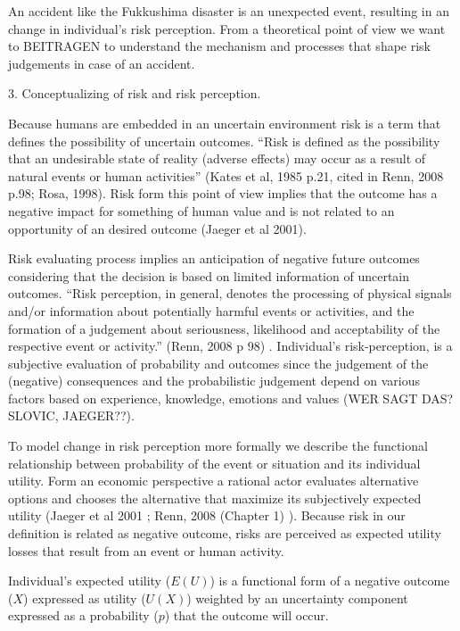 An accident like the Fukkushima disaster is an unexpected event, resulting in an change in individual's risk perception. From a theoretical point of view we want to BEITRAGEN to understand the mechanism and processes that shape risk judgements in case of an accident. 



                                                       

 
3. Conceptualizing of risk and risk perception. 

Because  humans are embedded in an uncertain environment risk is a term that defines the possibility of  uncertain outcomes.  ``Risk is defined as the possibility that an undesirable state of reality (adverse effects) may occur as a result of natural events or human activities'' (Kates et al, 1985 p.21, cited in Renn, 2008 p.98; Rosa, 1998). Risk form this point of view implies that the outcome has a negative impact for something of human value and is not related to an opportunity of an desired outcome (Jaeger et al 2001).

Risk evaluating process implies an anticipation of negative future outcomes considering that the decision is based on limited information of uncertain outcomes. ``Risk perception, in general, denotes the processing of physical signals and/or information about potentially harmful events or activities, and the formation of a judgement about seriousness, likelihood and acceptability of the respective event or activity.''  (Renn, 2008 p 98) \citep[98]{Renn:2008wq}. Individual's risk-perception, is a subjective evaluation of probability and outcomes since the judgement of the (negative) consequences and the probabilistic judgement depend on various factors based on experience, knowledge, emotions and values (WER SAGT DAS? SLOVIC, JAEGER??).        
 
To model change in risk perception more formally we describe the functional relationship between probability of the event or situation and its individual utility. 
Form an economic perspective a rational actor evaluates alternative options and chooses the alternative that maximize its subjectively expected utility (Jaeger et al 2001 \citep{Jaeger:2001wv}; Renn, 2008 (Chapter 1) \citep{Renn:2008wq}). Because risk in our definition is related as negative outcome, risks are perceived as expected utility losses that result from an event or human activity.
  
Individual's expected utility ($E(U)$) is a functional form of a negative outcome ($X$) expressed as utility ($U(X)$) weighted by an uncertainty component expressed as a probability ($p$) that the outcome will occur.  

